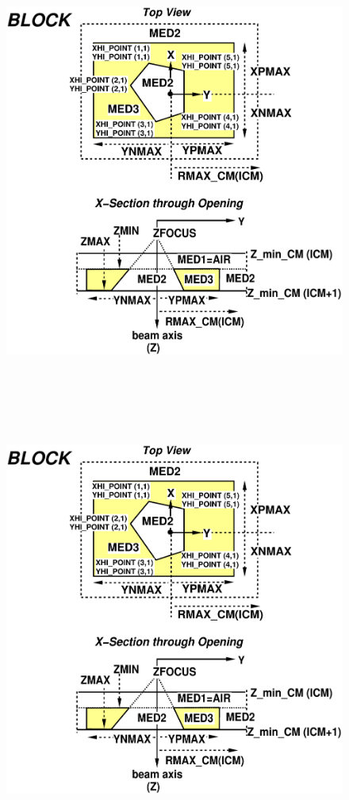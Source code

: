 \documentclass[12pt,twoside]{article}
\begin{document}
\begin{figure}[htp]
\begin{center}
\leavevmode
\begin{latexonly}
\includegraphics[height=15cm]{figures/blockd}
\end{latexonly}
\begin{htmlonly}
\includegraphics[height=14cm]{figures/blockd}

\end{htmlonly}
\end{center}
\end{figure}
\end{document}
